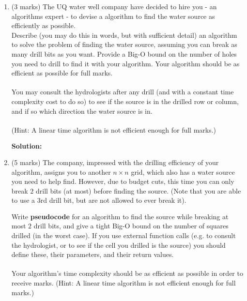 \documentclass[a4,13pt]{extarticle}
\newenvironment{Solution}{\color{blue}\textbf{Solution:}}{}
\begin{document}
\begin{enumerate}
	      \begin{enumerate} 
	      	\item (3 marks) The UQ water well company have decided to hire you - an algorithms expert - to devise a algorithm 
	      	      to find the water source as efficiently as possible. \\
	      	      	      	              
	      	      Describe (you may do this in words, but with sufficient detail) an algorithm to solve the problem of finding the water source, 
	      	      assuming you can break as many drill bits as you want. Provide a Big-O bound on the number of holes you need to drill to find 
	      	      it with your algorithm. Your algorithm should be as efficient as possible for full marks.\\\\
	      	      You may consult the hydrologists after any drill (and with a constant time complexity cost to do so) to see if 
	      	      the source is in the drilled row or column, and if so which direction the water source is in.\\\\
	      	      (Hint: A linear time algorithm is not efficient enough for full marks.)
	      	      
	      	\begin{Solution}
	      	\end{Solution}
	      	      	      	              
	      	\item 
	      	      (5 marks) The company, impressed with the drilling efficiency of your algorithm, assigns you to another $n \times n$ grid, 
	      	      which also has a water source you need to help find. However, due to budget cuts, this time you can only break $2$ drill 
	      	      bits (at most) before finding the source. (Note that you are able to use a $3$rd drill bit, but are not allowed to ever break it).
	      	      	      	              
	      	      Write \textbf{pseudocode} for an algorithm to find the source while breaking at most $2$ drill bits, and give a tight Big-O 
	      	      bound on the number of squares drilled (in the worst case). If you use external function calls (e.g. to consult the hydrologist, 
	      	      or to see if the cell you drilled is the source) you should define these, their parameters, and their return values. \\\\
	      	      Your algorithm's time complexity should be as efficient as possible in order to receive marks. 
	      	      (Hint: A linear time algorithm is not efficient enough for full marks.)
	      	      

\end{enumerate}
\end{enumerate}
\end{document}
